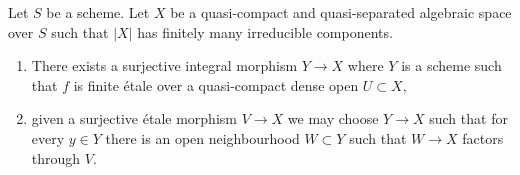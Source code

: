 %
\begin{lemma}
\label{lemma-there-is-a-scheme-integral-over-refined}
Let $S$ be a scheme. Let $X$ be a quasi-compact and quasi-separated
algebraic space over $S$ such that $|X|$ has finitely many irreducible
components.
\begin{enumerate}
\item There exists a surjective integral morphism $Y \to X$ where $Y$
is a scheme such that $f$ is finite \'etale over a quasi-compact
dense open $U \subset X$,
\item given a surjective \'etale morphism $V \to X$ we may choose
$Y \to X$ such that for every $y \in Y$ there is an open neighbourhood
$W \subset Y$ such that $W \to X$ factors through $V$.
\end{enumerate}
\end{lemma}

